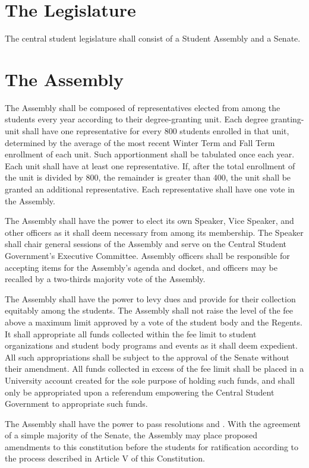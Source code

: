 
\section{The Legislature}
    The central student legislature shall consist of a Student Assembly and a Senate.


\section{The Assembly}
    The Assembly shall be composed of representatives elected from among the students every year according to their degree-granting unit. Each degree granting-unit shall have one representative for every 800 students enrolled in that unit, determined by the average of the most recent Winter Term and Fall Term enrollment of each unit. Such apportionment shall be tabulated once each year. Each unit shall have at least one representative. If, after the total enrollment of the unit is divided by 800, the remainder is greater than 400, the unit shall be granted an additional representative. Each representative shall have one vote in the Assembly. 

    The Assembly shall have the power to elect its own Speaker, Vice Speaker, and other officers as it shall deem necessary from among its membership. The Speaker shall chair general sessions of the Assembly and serve on the Central Student Government's Executive Committee. Assembly officers shall be responsible for accepting items for the Assembly's agenda and docket, and officers may be recalled by a two-thirds majority vote of the Assembly.

     The Assembly shall have the power to levy dues and provide for their collection equitably among the students. The Assembly shall not raise the level of the fee above a maximum limit approved by a vote of the student body and the Regents. It shall appropriate all funds collected within the fee limit to student organizations and student body programs and events as it shall deem expedient. All such appropriations shall be subject to the approval of the Senate without their amendment. All funds collected in excess of the fee limit shall be placed in a University account created for the sole purpose of holding such funds, and shall only be appropriated upon a referendum empowering the Central Student Government to appropriate such funds.

    The Assembly shall have the power to pass resolutions and . With the agreement of a simple majority of the Senate, the Assembly may place proposed amendments to this constitution before the students for ratification according to the process described in Article V of this Constitution.

